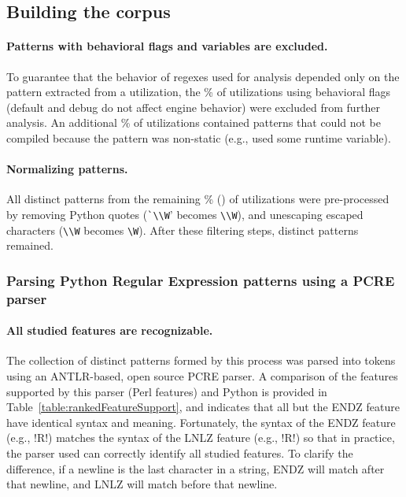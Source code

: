 \subsection{Building the corpus}
\paragraph{Patterns with behavioral flags and variables are excluded.} To guarantee that the behavior of regexes used for analysis depended only on the pattern extracted from a utilization, the \%  of utilizations using behavioral flags (default and debug do not affect engine behavior) were excluded from further analysis.  An additional \% of utilizations contained patterns that could not be compiled because the pattern was non-static (e.g., used some runtime variable).

\paragraph{Normalizing patterns.} All distinct patterns from the remaining \% () of utilizations were pre-processed by removing Python quotes (\verb!`\\W!' becomes \verb!\\W!), and unescaping escaped characters (\verb!\\W! becomes \verb!\W!).  After these filtering steps,  distinct patterns remained.

\subsubsection{Parsing Python Regular Expression patterns using a PCRE parser}
\paragraph{All studied features are recognizable.} The collection of distinct patterns formed by this process was parsed into tokens using an ANTLR-based, open source PCRE parser.  A comparison of the features supported by this parser (Perl features) and Python is provided in Table~\ref{table:rankedFeatureSupport}, and indicates that all but the ENDZ feature have identical syntax and meaning.  Fortunately, the syntax of the ENDZ feature (e.g., \cverb!R\Z!) matches the syntax of the LNLZ feature (e.g., \cverb!R\Z!) so that in practice, the parser used can correctly identify all studied features.  To clarify the difference, if a newline is the last character in a string, ENDZ will match after that newline, and LNLZ will match before that newline.

